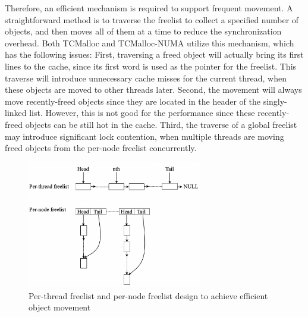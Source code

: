 Therefore, an efficient mechanism is required to support frequent movement. A straightforward method is to traverse the freelist to collect a specified number of objects, and then moves all of them at a time to reduce the synchronization overhead. Both TCMalloc and TCMalloc-NUMA utilize this mechanism, which has the following issues: First, traversing a freed object will actually bring its first lines to the cache, since its first word is used as the pointer for the freelist. This traverse will introduce unnecessary cache misses for the current thread, when these objects are moved to other threads later. 
Second, the movement will always move recently-freed objects since they are located in the header of the singly-linked list. However, this is not good for the performance since these recently-freed objects can be still hot in the cache. 
Third, the traverse of a global freelist may introduce significant lock contention, when multiple threads are moving freed objects from the per-node freelist concurrently. 
 

\begin{figure}[!h]
\centering
\includegraphics[width=3in]{SC2022/figure/efficient-movement.png}
\caption{Per-thread freelist and per-node freelist design to achieve efficient object movement\label{fig:perthreadlist}}
\end{figure}

